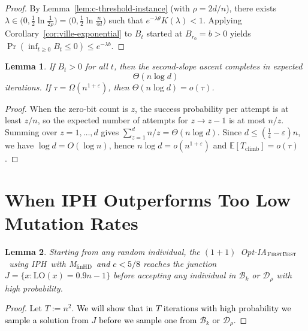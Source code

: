 \documentclass[lettersize,journal]{IEEEtran}
\newcommand{\EE}{\mathbb{E}}
\newcommand{\linHD}{M$_{\text{linHD}}$}
\newcommand{\IPHfcm}{IPH}
\newtheorem{lemma}{Lemma}
\begin{document}
{\begin{proof}
	By Lemma~\ref{lem:c-threshold-instance} (with $\rho=2d/n$), there exists
	$\lambda\in\big(0,\tfrac12\ln\tfrac{1}{2\rho}\big)=\big(0,\tfrac12\ln\tfrac{n}{4d}\big)$
	such that $e^{-\lambda\theta}K(\lambda)<1$. Applying Corollary~\ref{cor:ville-exponential}
	to $B_t$ started at $B_{r_0}=b>0$ yields
	$\Pr(\inf_{t\ge 0} B_t\le 0)\le e^{-\lambda b}$.
\end{proof}


\setcounter{theorem}{10}
\begin{lemma}%
	
	If $B_t>0$ for all $t$, then the second-slope ascent completes in expected
	\[
	\Theta(n\log d)
	\]
	iterations.  
	If $\tau=\Omega(n^{1+\varepsilon})$, then $\Theta(n\log d)=o(\tau)$.
\end{lemma}

\begin{proof}
	When the zero-bit count is $z$, the success probability per attempt is at least $z/n$, so the expected number of attempts for $z\!\to\! z-1$ is at most $n/z$.
	Summing over $z=1,\dots,d$ gives $\sum_{z=1}^{d}n/z=\Theta(n\log d)$.
	Since $d\le(\tfrac14-\varepsilon)n$, we have $\log d=O(\log n)$, hence $n\log d=o(n^{1+\varepsilon})$ and $\EE[T_{\mathrm{climb}}]=o(\tau)$.
\end{proof}



 
 
 
\section{When IPH Outperforms Too Low Mutation Rates}\label{sec:ltj}

\setcounter{theorem}{11}
\begin{lemma} %
	Starting from any random individual, the $(1+1)$~Opt-IA$_{\textsc{FirstBest}}$~using \IPHfcm{}~with \linHD~\textcolor{black}{and $c<5/8$}  reaches the junction $J = \{x : \mathrm{LO}(x)=0.9n-1\}$ before accepting any individual in $\mathcal{B}_k$ or $\mathcal{D}_\rho$ with high probability.
\end{lemma}



\begin{proof}
	Let $T:=n^2$. \textcolor{black}{We will show that in $T$ iterations with high probability we sample a solution from  $J$ before we sample one from $\mathcal{B}_k$ or $\mathcal{D}_\rho$.}


\end{proof}}
\end{document}
